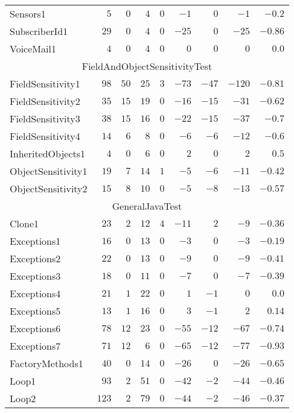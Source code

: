 \documentclass[../draft.tex]{subfiles}
\newcommand{\tsubEight}[1]{\multicolumn{9}{c}{#1}\\\hline}
\begin{document}
\begin{longtable}{l | r | r | r | r | r | r | r | r}
        Sensors1 & $5$ & $0$ & $4$ & $0$ & $-1$ & $0$ & $-1$ & $-0.2$\\
        SubscriberId1 & $29$ & $0$ & $4$ & $0$ & $-25$ & $0$ & $-25$ & $-0.86$\\
        VoiceMail1 & $4$ & $0$ & $4$ & $0$ & $0$ & $0$ & $0$ & $0.0$\\
        \hline
        \tsubEight{FieldAndObjectSensitivityTest}
        FieldSensitivity1 & $98$ & $50$ & $25$ & $3$ & $-73$ & $-47$ & $-120$ & $-0.81$\\
        FieldSensitivity2 & $35$ & $15$ & $19$ & $0$ & $-16$ & $-15$ & $-31$ & $-0.62$\\
        FieldSensitivity3 & $38$ & $15$ & $16$ & $0$ & $-22$ & $-15$ & $-37$ & $-0.7$\\
        FieldSensitivity4 & $14$ & $6$ & $8$ & $0$ & $-6$ & $-6$ & $-12$ & $-0.6$\\
        InheritedObjects1 & $4$ & $0$ & $6$ & $0$ & $2$ & $0$ & $2$ & $0.5$\\
        ObjectSensitivity1 & $19$ & $7$ & $14$ & $1$ & $-5$ & $-6$ & $-11$ & $-0.42$\\
        ObjectSensitivity2 & $15$ & $8$ & $10$ & $0$ & $-5$ & $-8$ & $-13$ & $-0.57$\\
        \hline
        \tsubEight{GeneralJavaTest}
        Clone1 & $23$ & $2$ & $12$ & $4$ & $-11$ & $2$ & $-9$ & $-0.36$\\
        Exceptions1 & $16$ & $0$ & $13$ & $0$ & $-3$ & $0$ & $-3$ & $-0.19$\\
        Exceptions2 & $22$ & $0$ & $13$ & $0$ & $-9$ & $0$ & $-9$ & $-0.41$\\
        Exceptions3 & $18$ & $0$ & $11$ & $0$ & $-7$ & $0$ & $-7$ & $-0.39$\\
        Exceptions4 & $21$ & $1$ & $22$ & $0$ & $1$ & $-1$ & $0$ & $0.0$\\
        Exceptions5 & $13$ & $1$ & $16$ & $0$ & $3$ & $-1$ & $2$ & $0.14$\\
        Exceptions6 & $78$ & $12$ & $23$ & $0$ & $-55$ & $-12$ & $-67$ & $-0.74$\\
        Exceptions7 & $71$ & $12$ & $6$ & $0$ & $-65$ & $-12$ & $-77$ & $-0.93$\\
        FactoryMethods1 & $40$ & $0$ & $14$ & $0$ & $-26$ & $0$ & $-26$ & $-0.65$\\
        Loop1 & $93$ & $2$ & $51$ & $0$ & $-42$ & $-2$ & $-44$ & $-0.46$\\
        Loop2 & $123$ & $2$ & $79$ & $0$ & $-44$ & $-2$ & $-46$ & $-0.37$\\

\end{longtable}
\end{document}
